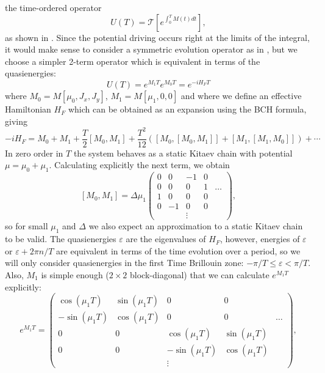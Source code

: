 \documentclass[11pt]{report}
\newcommand{\en}{\varepsilon}
\begin{document}
the time-ordered operator 
%
\begin{equation}
	U(T) = \mathcal{T} \left[e^{ \int^T_0 M(t)dt}\right],
\end{equation}
%
as shown in \cite{Dutta2013}. Since the potential driving occurs right at the limits of the integral, it would make sense to consider a symmetric evolution operator as in \cite{Dutta2013}, but we choose a simpler 2-term operator which is equivalent in terms of the quasienergies:
%
\begin{equation}
U(T) = e^{M_1 T}e^{M_0 T} = e^{-iH_{F}T}
\end{equation}
%
where $M_0 = M[\mu_0,J_x,J_y]$, $M_1 = M[\mu_1,0,0]$ and where we define an effective Hamiltonian $H_{F}$ which can be obtained as an expansion using the BCH formula, giving
%
\begin{equation}
-iH_{F} = M_0 + M_1 + \frac{T}{2}[M_0,M_1] +\frac{T^2}{12}([M_0,[M_0,M_1]]+[M_1,[M_1,M_0]])+\cdots
\end{equation}
%
In zero order in $T$ the system behaves as a static Kitaev chain with potential $\mu = \mu_0 + \mu_1$. Calculating explicitly the next term, we obtain 
%
\begin{equation}
\label{eq:1st_order}
[M_0,M_1] = \Delta\mu_1 \left(\begin{matrix}
		0 & 0 & -1 & 0 \\
		0 & 0 & 0 & 1 & \dots \\
		1 & 0 & 0 & 0 \\
		0 & -1 & 0 & 0\\
		 & & \vdots & 
	\end{matrix} \right),
\end{equation}
%
so for small $\mu_1$ and $\Delta$ we also expect an approximation to a static Kitaev chain to be valid. The quasienergies $\en$ are the eigenvalues of $H_F$, however, energies of $\en$ or $\en+2\pi n/T$ are equivalent in terms of the time evolution over a period, so we will only consider quasienergies in the first Time Brillouin zone: $ -\pi/T \leq \en < \pi/T$. Also, $M_1$ is simple enough ($2\times2$ block-diagonal) that we can calculate $e^{M_1 T}$ explicitly:
%
\begin{equation}
	e^{M_1 T} = \left(\begin{matrix}
			\cos(\mu_1 T) & \sin(\mu_1 T) & 0 & 0 \\
			-\sin(\mu_1 T) & \cos(\mu_1 T) & 0 & 0 & \dots \\
			0 & 0 & \cos(\mu_1 T) & \sin(\mu_1 T) \\
			0 & 0 & -\sin(\mu_1 T) & \cos(\mu_1 T)\\
			  & & \vdots & 
	\end{matrix} \right),
\end{equation}
\end{document}
